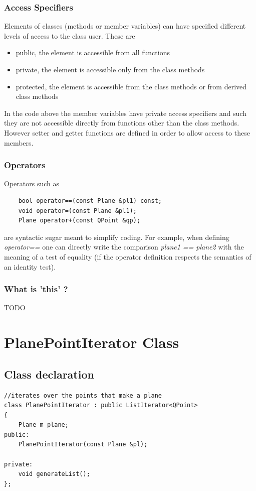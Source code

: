 \documentclass{article}
\begin{document}
\subsubsection {Access Specifiers}
Elements of classes (methods or member variables) can have specified different levels of access to the class user. These are 
\begin{itemize}
\item public, the element is accessible from all functions
\item private, the element is accessible only from the class methods
\item protected, the element is accessible from the class methods or from derived class methods
\end{itemize}  
In the code above the member variables have private access specifiers and such they are not accessible directly from functions other than the class methods. However setter and getter functions are defined in order to allow access to these members. 

\subsubsection {Operators}
Operators such as
\begin{lstlisting}
    bool operator==(const Plane &pl1) const;
    void operator=(const Plane &pl1);
    Plane operator+(const QPoint &qp);
\end{lstlisting}
are syntactic sugar meant to simplify coding. For example, when defining \textit{operator==} one can directly write the comparison \textit{ plane1 == plane2 } with the meaning of a test of equality (if the operator definition respects the semantics of an identity test). 

\subsubsection {What is 'this' ? }
TODO

\section{PlanePointIterator Class}

\subsection {Class declaration}

\begin{lstlisting}
//iterates over the points that make a plane
class PlanePointIterator : public ListIterator<QPoint>
{
    Plane m_plane;
public:
    PlanePointIterator(const Plane &pl);

private:
    void generateList();
};
\end{lstlisting}
\end{document}

